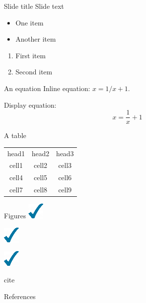 \documentclass{beamer}
\begin{document}
\begin{frame}{Slide title}
Slide text
\begin{itemize}
  \item One item 
  \item Another item
\end{itemize}

\begin{enumerate}
  \item First item
  \item Second item
\end{enumerate}
\end{frame}

\begin{frame}{An equation}
Inline equation: $x = 1/x+1$.

Display equation:
\begin{equation}
  x = \frac{1}{x}+1
\end{equation}
\end{frame}

\begin{frame}{A table}
  \begin{tabular}{ c | c | c }
    head1 & head2 & head3 \\
    cell1 & cell2 & cell3 \\ 
    cell4 & cell5 & cell6 \\  
    cell7 & cell8 & cell9    
  \end{tabular}
\end{frame}

\begin{frame}{Figures}
  \includegraphics{bluecheck.png}
  
  \includegraphics{bluecheck.png}
  
  \includegraphics{bluecheck.png}
\end{frame}

\begin{frame}{cite}
  \citep{texbook}

  \citet{texbook}

  \citealt{texbook}

  \citep{knuth:1984,latex2e}

  \citet{knuth:1984,latex2e}

  \citealt{knuth:1984,latex2e}
\end{frame}

\begin{frame}{References}
  
  
\end{frame}
\end{document}
